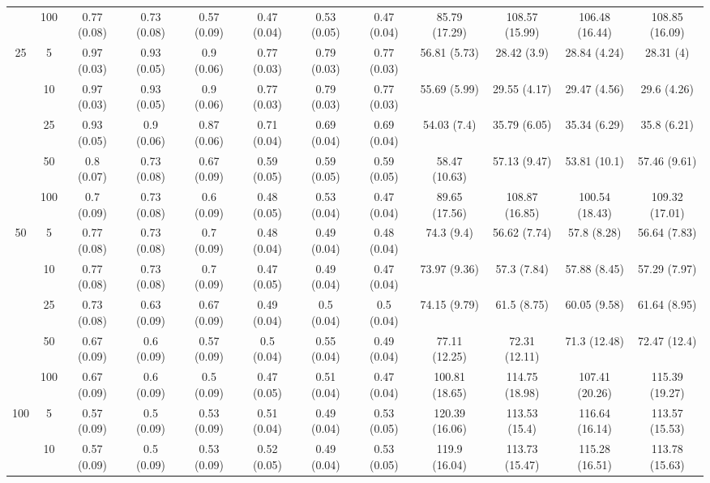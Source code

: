 \documentclass[10pt]{article}
\theoremstyle{definition}
\begin{document}
\begin{table}[H]
\begin{center}
{\begin{tabular}{cc|ccc|ccc|cccc|}
    & 100  & 0.77 (0.08) & 0.73 (0.08) & 0.57 (0.09) & 0.47 (0.04) & 0.53 (0.05) & 0.47 (0.04) & 85.79 (17.29) & 108.57 (15.99) & 106.48 (16.44) & 108.85 (16.09)\\[.3cm]  
   \multirow{5}{*}{25} & 5  & 0.97 (0.03) & 0.93 (0.05) & 0.9 (0.06) & 0.77 (0.03) & 0.79 (0.03) & 0.77 (0.03) & 56.81 (5.73) & 28.42 (3.9) & 28.84 (4.24) & 28.31 (4) \\ 
    & 10  & 0.97 (0.03) & 0.93 (0.05) & 0.9 (0.06) & 0.77 (0.03) & 0.79 (0.03) & 0.77 (0.03) & 55.69 (5.99) & 29.55 (4.17) & 29.47 (4.56) & 29.6 (4.26) \\ 
    & 25  & 0.93 (0.05) & 0.9 (0.06) & 0.87 (0.06) & 0.71 (0.04) & 0.69 (0.04) & 0.69 (0.04) & 54.03 (7.4) & 35.79 (6.05) & 35.34 (6.29) & 35.8 (6.21) \\ 
    & 50  & 0.8 (0.07) & 0.73 (0.08) & 0.67 (0.09) & 0.59 (0.05) & 0.59 (0.05) & 0.59 (0.05) & 58.47 (10.63) & 57.13 (9.47) & 53.81 (10.1) & 57.46 (9.61) \\ 
    & 100  & 0.7 (0.09) & 0.73 (0.08) & 0.6 (0.09) & 0.48 (0.05) & 0.53 (0.04) & 0.47 (0.04) & 89.65 (17.56) & 108.87 (16.85) & 100.54 (18.43) & 109.32 (17.01) \\[.3cm] 
   \multirow{5}{*}{50} & 5  & 0.77 (0.08) & 0.73 (0.08) & 0.7 (0.09) & 0.48 (0.04) & 0.49 (0.04) & 0.48 (0.04) & 74.3 (9.4) & 56.62 (7.74) & 57.8 (8.28) & 56.64 (7.83) \\ 
    & 10  & 0.77 (0.08) & 0.73 (0.08) & 0.7 (0.09) & 0.47 (0.05) & 0.49 (0.04) & 0.47 (0.04) & 73.97 (9.36) & 57.3 (7.84) & 57.88 (8.45) & 57.29 (7.97) \\ 
    & 25  & 0.73 (0.08) & 0.63 (0.09) & 0.67 (0.09) & 0.49 (0.04) & 0.5 (0.04) & 0.5 (0.04) & 74.15 (9.79) & 61.5 (8.75) & 60.05 (9.58) & 61.64 (8.95) \\ 
    & 50  & 0.67 (0.09) & 0.6 (0.09) & 0.57 (0.09) & 0.5 (0.04) & 0.55 (0.04) & 0.49 (0.04) & 77.11 (12.25) & 72.31 (12.11) & 71.3 (12.48) & 72.47 (12.4) \\ 
    & 100  & 0.67 (0.09) & 0.6 (0.09) & 0.5 (0.09) & 0.47 (0.05) & 0.51 (0.04) & 0.47 (0.04) & 100.81 (18.65) & 114.75 (18.98) & 107.41 (20.26) & 115.39 (19.27) \\[.3cm] 
  \multirow{5}{*}{100} & 5  & 0.57 (0.09) & 0.5 (0.09) & 0.53 (0.09) & 0.51 (0.04) & 0.49 (0.04) & 0.53 (0.05) & 120.39 (16.06) & 113.53 (15.4) & 116.64 (16.14) & 113.57 (15.53) \\ 
    & 10  & 0.57 (0.09) & 0.5 (0.09) & 0.53 (0.09) & 0.52 (0.05) & 0.49 (0.04) & 0.53 (0.05) & 119.9 (16.04) & 113.73 (15.47) & 115.28 (16.51) & 113.78 (15.63) \\ 

\end{tabular}}
\end{center}
\end{table}
\end{document}
